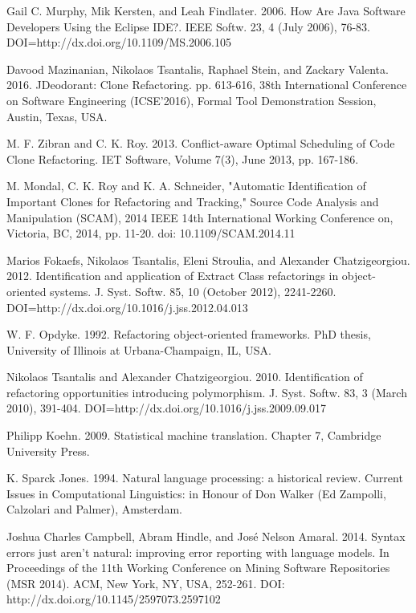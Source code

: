 \documentclass[conference]{IEEEtran}
\begin{document}
\begin{thebibliography}{}
Gail C. Murphy, Mik Kersten, and Leah Findlater. 2006. How Are Java Software Developers Using the Eclipse IDE?. IEEE Softw. 23, 4 (July 2006), 76-83. DOI=http://dx.doi.org/10.1109/MS.2006.105

Davood Mazinanian, Nikolaos Tsantalis, Raphael Stein, and Zackary Valenta. 2016. JDeodorant: Clone Refactoring. pp. 613-616, 38th International Conference on Software Engineering (ICSE'2016), Formal Tool Demonstration Session, Austin, Texas, USA.

M. F. Zibran and C. K. Roy. 2013. Conflict-aware Optimal Scheduling of Code Clone Refactoring. IET Software, Volume 7(3), June 2013, pp. 167-186.

M. Mondal, C. K. Roy and K. A. Schneider, "Automatic Identification of Important Clones for Refactoring and Tracking," Source Code Analysis and Manipulation (SCAM), 2014 IEEE 14th International Working Conference on, Victoria, BC, 2014, pp. 11-20.
doi: 10.1109/SCAM.2014.11

Marios Fokaefs, Nikolaos Tsantalis, Eleni Stroulia, and Alexander Chatzigeorgiou. 2012. Identification and application of Extract Class refactorings in object-oriented systems. J. Syst. Softw. 85, 10 (October 2012), 2241-2260. DOI=http://dx.doi.org/10.1016/j.jss.2012.04.013 

W. F. Opdyke. 1992. Refactoring object-oriented frameworks. PhD thesis, University of Illinois at Urbana-Champaign, IL, USA.

Nikolaos Tsantalis and Alexander Chatzigeorgiou. 2010. Identification of refactoring opportunities introducing polymorphism. J. Syst. Softw. 83, 3 (March 2010), 391-404. DOI=http://dx.doi.org/10.1016/j.jss.2009.09.017

Philipp Koehn. 2009. Statistical machine translation. Chapter 7, Cambridge University Press.

K. Sparck Jones. 1994. Natural language processing: a historical review. Current Issues in Computational Linguistics: in Honour of Don Walker (Ed Zampolli, Calzolari and Palmer), Amsterdam.

Joshua Charles Campbell, Abram Hindle, and José Nelson Amaral. 2014. Syntax errors just aren't natural: improving error reporting with language models. In Proceedings of the 11th Working Conference on Mining Software Repositories (MSR 2014). ACM, New York, NY, USA, 252-261. DOI: http://dx.doi.org/10.1145/2597073.2597102


\end{thebibliography}
\end{document}

